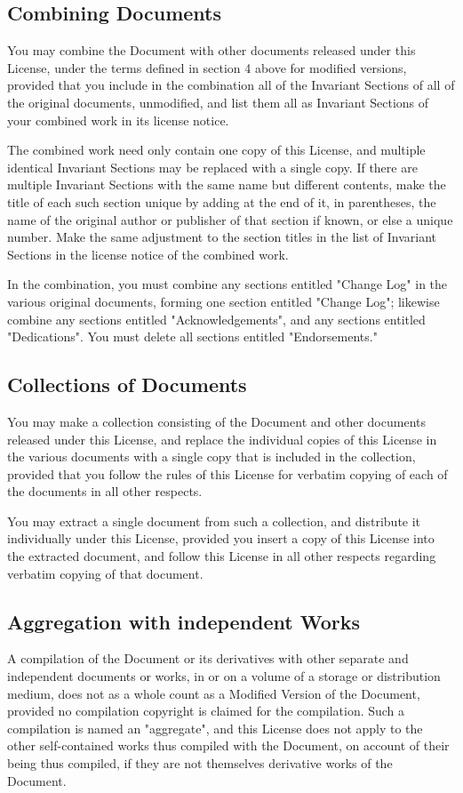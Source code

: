 	\subsection{Combining Documents}
	You may combine the Document with other documents released under this License, under the terms defined in section 4 above for modified versions, provided that you include in the combination all of the Invariant Sections of all of the original documents, unmodified, and list them all as Invariant Sections of your combined work in its license notice. 

	The combined work need only contain one copy of this License, and multiple identical Invariant Sections may be replaced with a single copy. If there are multiple Invariant Sections with the same name but different contents, make the title of each such section unique by adding at the end of it, in parentheses, the name of the original author or publisher of that section if known, or else a unique number. Make the same adjustment to the section titles in the list of Invariant Sections in the license notice of the combined work. 

	In the combination, you must combine any sections entitled "Change Log" in the various original documents, forming one section entitled "Change Log"; likewise combine any sections entitled "Acknowledgements", and any sections entitled "Dedications". You must delete all sections entitled "Endorsements." 

	\subsection{Collections of Documents}
	You may make a collection consisting of the Document and other documents released under this License, and replace the individual copies of this License in the various documents with a single copy that is included in the collection, provided that you follow the rules of this License for verbatim copying of each of the documents in all other respects. 

	You may extract a single document from such a collection, and distribute it individually under this License, provided you insert a copy of this License into the extracted document, and follow this License in all other respects regarding verbatim copying of that document. 

	\subsection{Aggregation with independent Works} 
	A compilation of the Document or its derivatives with other separate and independent documents or works, in or on a volume of a storage or distribution medium, does not as a whole count as a Modified Version of the Document, provided no compilation copyright is claimed for the compilation. Such a compilation is named an "aggregate", and this License does not apply to the other self-contained works thus compiled with the Document, on account of their being thus compiled, if they are not themselves derivative works of the Document. 


